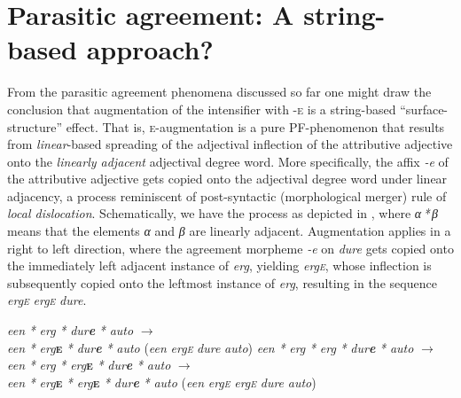 \documentclass[output=paper]{langsci/langscibook}
\begin{document}
\section{Parasitic agreement: A string-based approach?}\label{sec:18.5}

From the parasitic agreement phenomena discussed so far one might draw the
conclusion that augmentation of the intensifier with \textsc{-e} is a
string-based “surface-structure” effect. That is, \textsc{e}-augmentation is a
pure \gls{PF}-phenomenon that results from \emph{linear}-based spreading of the
adjectival inflection of the attributive adjective onto the \emph{linearly
adjacent} adjectival degree word. More specifically, the affix \emph{-e} of the
attributive adjective gets copied onto the adjectival degree word under linear
adjacency, a process reminiscent of 
post-syntactic (morphological merger) rule of \emph{local dislocation}.
Schematically, we have the process as depicted in , where
\emph{α\,*\,β} means that the elements \emph{α} and \emph{β} are
linearly adjacent. Augmentation applies in a right to left direction, where the
agreement morpheme \emph{-e} on \emph{dure} gets copied onto the immediately
left adjacent instance of \emph{erg}, yielding \emph{erg\textsc{e}}, whose
inflection is subsequently copied onto the leftmost instance of \emph{erg},
resulting in the sequence \emph{erg\textsc{e}} \emph{erg\textsc{e}}
\emph{dure}.

\ea%
    \label{ex:18.20}
	\ea \emph{een}   \emph{*} \emph{erg}   \emph{*} \emph{dur}\textbf{\emph{e}} \emph{*} \emph{auto}                ${\rightarrow}$ \\
              \emph{een} \emph{*} \emph{erg}\textbf{\textsc{e}} \emph{*}
              \emph{dur}\textbf{\emph{e}} \emph{*} \emph{auto}
              (\emph{een} \emph{erg\textsc{e}} \emph{dure} \emph{auto})
	\ex \emph{een} \emph{*} \emph{erg} \emph{*} \emph{erg} \emph{*} \emph{dur}\textbf{\emph{e}} \emph{*} \emph{auto}      ${\rightarrow}$ \\
              \emph{een} \emph{*} \emph{erg} \emph{*} \emph{erg}\textbf{\textsc{e}} \emph{*} \emph{dur}\textbf{\emph{e}} \emph{*} \emph{auto}    ${\rightarrow}$ \\
              \emph{een} \emph{*} \emph{erg}\textbf{\textsc{e}} \emph{*}
              \emph{erg}\textbf{\textsc{e}} \emph{*}
              \emph{dur}\textbf{\emph{e}} \emph{*} \emph{auto}
              (\emph{een} \emph{erg\textsc{e}} \emph{erg\textsc{e}} \emph{dure}
              \emph{auto})
	\z
\z
\end{document}
